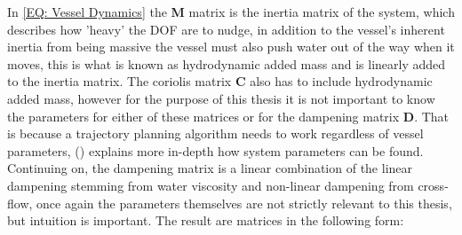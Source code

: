 

In \eqref{EQ: Vessel Dynamics} the \textbf{M} matrix is the inertia matrix of the system, which describes how 'heavy' the \gls{DOF} are to nudge, in
addition to the vessel's inherent inertia from being massive the vessel must also push water out of the way when it moves, this is what is known as
hydrodynamic added mass and is linearly added to the inertia matrix. The coriolis matrix \textbf{C} also has to include hydrodynamic added mass,
however for the purpose of this thesis it is not important to know the parameters for either of these matrices or for the dampening matrix \textbf{D}.
That is because a trajectory planning algorithm needs to work regardless of vessel parameters, (\cite{pedersen2019optimization}) explains more in-depth
how system parameters can be found. Continuing on, the dampening matrix is a linear combination of the linear dampening stemming from water
viscosity and non-linear dampening from cross-flow, once again the parameters themselves are not strictly relevant to this thesis, but intuition is
important. The result are matrices in the following form:


